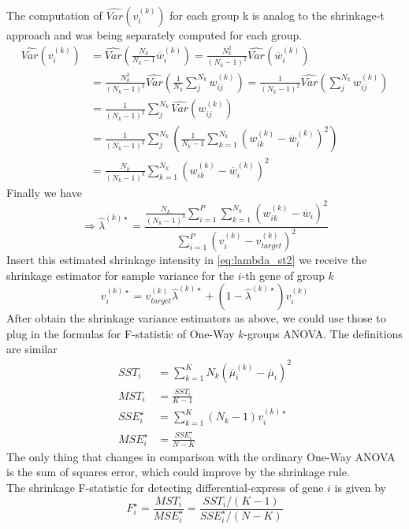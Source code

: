 The computation of $\widehat{Var}(v^{(k)}_i)$ for each group k is analog to the shrinkage-t approach and was being separately computed for each group.
\begin{align*}
	\widehat{Var}(v^{(k)}_i) 
		&= \widehat{Var}(\frac{N_k}{N_k-1}\overline{w}^{(k)}_i) 
			= \frac{N_k^2}{(N_k-1)^2}\widehat{Var}(\overline{w}^{(k)}_i) \\
		&= \frac{N_k^2}{(N_k-1)^2}\widehat{Var}(\frac{1}{N_k}\sum^{N_k}_j{w^{(k)}_{ij}}) 
			= \frac{1}{(N_k-1)^2}\widehat{Var}(\sum^{N_k}_j{w^{(k)}_{ij}}) \\
		&= \frac{1}{(N_k-1)^2}\sum^{N_k}_j\widehat{Var}({w^{(k)}_{ij}}) \\
		&= \frac{1}{(N_k-1)^2}\sum^{N_k}_j\left(\frac{1}{N_k-1}\sum^{N_k}_{k=1}(w^{(k)}_{ik} - \overline{w}^{(k)}_i)^2 \right) \\
		&= \frac{N_k}{(N_k-1)^3}\sum^{N_k}_{k=1}(w^{(k)}_{ik} - \overline{w}^{(k)}_i)^2
\end{align*}
Finally we have
\begin{equation} \label{eq:lambda_st_ANOVA}
	\Rightarrow \hat \lambda^{(k)\star} 
		= \frac	{\frac{N_k}{(N_k-1)^3}\sum^P_{i=1}\sum^{N_k}_{k=1}(w^{(k)}_{ik} - \overline{w}_i)^2}
				{\sum^P_{i=1}(v^{(k)}_i - v^{(k)}_{target})^2}	
\end{equation}
Insert this estimated shrinkage intensity in \autoref{eq:lambda_st2} we receive the shrinkage estimator for sample variance for the $i$-th gene of group $k$
\begin{equation}
	v^{(k)\star}_i = v^{(k)}_{target} \hat \lambda^{(k)\star}  + (1-\hat \lambda^{(k)\star})v^{(k)}_i
\end{equation}
After obtain the shrinkage variance estimators as above, we could use those to plug in the formulas for F-statistic of One-Way $k$-groups ANOVA. The definitions are similar
\begin{align} 
	SST_{i} 	&= \sum^K_{k=1}N_k(\overline \mu^{(k)}_i - \overline \mu_i)^2 \\
	MST_{i} 	&= \frac{ SST_{i} }{ K - 1 } \\
	\label{eq:SSE-shrink}
	SSE_i^{\star} 		&= \sum^K_{k=1}(N_k - 1)v^{(k)\star}_i \\
	\label{eq:MSE-shrink}
	MSE_i^{\star} 		&= \frac{ SSE_i^{\star} }{ N - K }
\end{align}
The only thing that changes in comparison with the ordinary One-Way ANOVA is the sum of squares error, which could improve by the shrinkage rule.\\
The shrinkage F-statistic for detecting differential-express of gene $i$ is given by
\begin{equation}
	F^{\star}_i = \frac{MST_i}{MSE_i^{\star}} = \frac{SST_i / (K-1)}{SSE_i^{\star} / (N-K)}
\end{equation}
